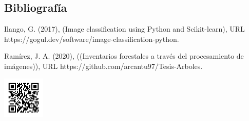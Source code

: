 \documentclass[a0,portrait]{a0poster}
\begin{document}
\begin{multicols}{2}
\section*{Bibliografía}
Ilango, G. (2017), (Image classification using Python and Scikit-learn), URL https://gogul.dev/software/image-classification-python.

Ramírez, J. A. (2020), ((Inventarios forestales a través del procesamiento de
imágenes)), URL https://github.com/arcantu97/Tesis-Arboles.

\hspace*{120mm}\includegraphics[width=0.15\textwidth]{frame.png}
\clearpage
\end{multicols}
\end{document}
